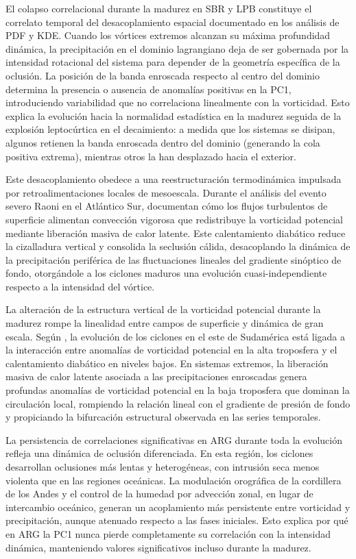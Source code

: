 El colapso correlacional durante la madurez en SBR y LPB constituye el correlato temporal del desacoplamiento espacial documentado en los análisis de PDF y KDE. Cuando los vórtices extremos alcanzan su máxima profundidad dinámica, la precipitación en el dominio lagrangiano deja de ser gobernada por la intensidad rotacional del sistema para depender de la geometría específica de la oclusión. La posición de la banda enroscada respecto al centro del dominio determina la presencia o ausencia de anomalías positivas en la PC1, introduciendo variabilidad que no correlaciona linealmente con la vorticidad. Esto explica la evolución hacia la normalidad estadística en la madurez seguida de la explosión leptocúrtica en el decaimiento: a medida que los sistemas se disipan, algunos retienen la banda enroscada dentro del dominio (generando la cola positiva extrema), mientras otros la han desplazado hacia el exterior.

Este desacoplamiento obedece a una reestructuración termodinámica impulsada por retroalimentaciones locales de mesoescala. Durante el análisis del evento severo Raoni en el Atlántico Sur, \citet{reboita2022from} documentan cómo los flujos turbulentos de superficie alimentan convección vigorosa que redistribuye la vorticidad potencial mediante liberación masiva de calor latente. Este calentamiento diabático reduce la cizalladura vertical y consolida la seclusión cálida, desacoplando la dinámica de la precipitación periférica de las fluctuaciones lineales del gradiente sinóptico de fondo, otorgándole a los ciclones maduros una evolución cuasi-independiente respecto a la intensidad del vórtice.

La alteración de la estructura vertical de la vorticidad potencial durante la madurez rompe la linealidad entre campos de superficie y dinámica de gran escala. Según \citet{crespo2021potential}, la evolución de los ciclones en el este de Sudamérica está ligada a la interacción entre anomalías de vorticidad potencial en la alta troposfera y el calentamiento diabático en niveles bajos. En sistemas extremos, la liberación masiva de calor latente asociada a las precipitaciones enroscadas genera profundas anomalías de vorticidad potencial en la baja troposfera que dominan la circulación local, rompiendo la relación lineal con el gradiente de presión de fondo y propiciando la bifurcación estructural observada en las series temporales.

La persistencia de correlaciones significativas en ARG durante toda la evolución refleja una dinámica de oclusión diferenciada. En esta región, los ciclones desarrollan oclusiones más lentas y heterogéneas, con intrusión seca menos violenta que en las regiones oceánicas. La modulación orográfica de la cordillera de los Andes y el control de la humedad por advección zonal, en lugar de intercambio oceánico, generan un acoplamiento más persistente entre vorticidad y precipitación, aunque atenuado respecto a las fases iniciales. Esto explica por qué en ARG la PC1 nunca pierde completamente su correlación con la intensidad dinámica, manteniendo valores significativos incluso durante la madurez.

